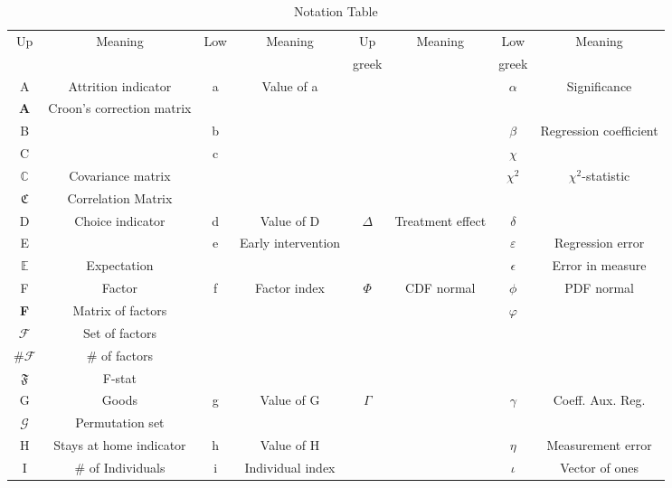 \begin{center}
\begin{table} \caption*{Notation Table}
\scriptsize
\begin{tabular}{cc cc cc cc} \hline \hline
Up			& Meaning					& Low	& Meaning						& Up 		& Meaning 			& Low 			& Meaning 				\\ 
			& 						& 	&							& greek	&				& greek			&					\\ \hline
A			& Attrition indicator			& a	& 	Value of a					& 		&				& $\alpha$			& Significance			\\
\textbf{A}		& Croon's correction matrix	& 	& 							& 		&					& 				& 						\\
B			&						& b	& 								& 			&					& $\beta$		& Regression coefficient	\\	
C			&  						& c	& 								&			&					& $\chi$		&						\\
$\mathbb{C}$	&	Covariance matrix 		& 	& 								&			&					& $\chi^2$& $\chi^2$-statistic						\\		
$\mathfrak{C}$			&  Correlation Matrix						& 	& 								&			&					&		&						\\			
D			& Choice indicator			& d	& Value of D					& $\Delta$	& Treatment effect	& $\delta$		&						\\		
E			&						& e	& Early intervention			&		&				& $\varepsilon$	& Regression error		\\
$\mathbb{E}$	& Expectation				& 	&						&		&				& $\epsilon$			& Error in measure					\\  
F			& Factor					& f	& Factor index			& $\Phi$	& CDF normal		& $\phi$		& PDF normal			\\
\textbf{F}		& Matrix of factors			& 	& 			& 			&					& $\varphi$		&						\\
$\mathcal{F}$	& Set of factors			&	&			& 			&					& 	&					\\
$\#\mathcal{F}$	& \# of factors		&	&			& 			&					& 	&					\\
$\mathfrak{F}$	& F-stat					&	&			& 			&					& 	&					\\
G			& Goods					& g	& Value of G 					& $\Gamma$	& 					& $\gamma$		& Coeff. Aux. Reg.	\\
$\mathcal{G}$ & Permutation set & 	& 					& 	& 					& 		&  \\
H			& 	Stays at home indicator	& h	& Value of H				&			&					& $\eta$		& Measurement error		\\
I			& \# of Individuals			& i	& Individual index				&			&					& $\iota$		&	Vector of ones					\\

\end{tabular}
\end{table}
\end{center}
